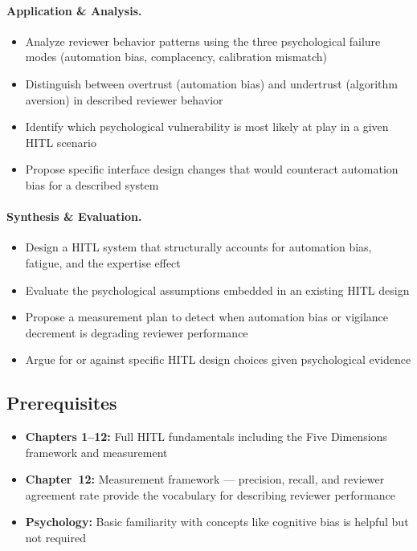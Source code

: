 \paragraph{Application \& Analysis.}
\begin{itemize}
    \item Analyze reviewer behavior patterns using the three psychological failure modes (automation bias, complacency, calibration mismatch)
    \item Distinguish between overtrust (automation bias) and undertrust (algorithm aversion) in described reviewer behavior
    \item Identify which psychological vulnerability is most likely at play in a given HITL scenario
    \item Propose specific interface design changes that would counteract automation bias for a described system
\end{itemize}

\paragraph{Synthesis \& Evaluation.}
\begin{itemize}
    \item Design a HITL system that structurally accounts for automation bias, fatigue, and the expertise effect
    \item Evaluate the psychological assumptions embedded in an existing HITL design
    \item Propose a measurement plan to detect when automation bias or vigilance decrement is degrading reviewer performance
    \item Argue for or against specific HITL design choices given psychological evidence
\end{itemize}

\subsection{Prerequisites}
\begin{itemize}
    \item \textbf{Chapters 1--12:} Full HITL fundamentals including the Five Dimensions framework and measurement
    \item \textbf{Chapter~12:} Measurement framework --- precision, recall, and reviewer agreement rate provide the vocabulary for describing reviewer performance
    \item \textbf{Psychology:} Basic familiarity with concepts like cognitive bias is helpful but not required
\end{itemize}

